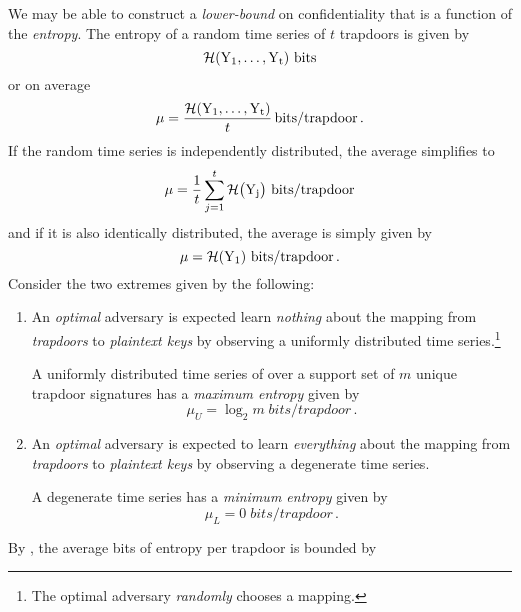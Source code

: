\documentclass[ ../main.tex]{subfiles}
\begin{document}
We may be able to construct a \emph{lower-bound} on confidentiality that is a function of the \emph{entropy}. The entropy of a random time series of $t$ trapdoors is given by
\begin{equation}
    \entropy\!\left(\rv{Y_1},\ldots,\rv{Y_t}\right)\, \si{bits}
\end{equation}
or on average
\begin{equation}
    \mu = \frac{\entropy\!\left(\rv{Y_1},\ldots,\rv{Y_t}\right)}{t} \, \si{bits \per trapdoor}\,.
\end{equation}
If the random time series is independently distributed, the average simplifies to
\begin{equation}
    \mu = \frac{1}{t} \sum_{j=1}^{t} \entropy\!\left(\rv{Y_j}\right) \, \si{bits \per trapdoor}
\end{equation}
and if it is also identically distributed, the average is simply given by
\begin{equation}
    \mu = \entropy\!\left(\rv{Y_1}\right) \, \si{bits \per trapdoor}\,.
\end{equation}
Consider the two extremes given by the following:
\begin{enumerate}
    \item
    \label{itm:maxentropy}
    An \emph{optimal} adversary is expected learn \emph{nothing} about the mapping from \emph{trapdoors} to \emph{plaintext keys} by observing a uniformly distributed time series.\footnote{The optimal adversary \emph{randomly} chooses a mapping.}
    
    A uniformly distributed time series of over a support set of $m$ unique trapdoor signatures has a \emph{maximum entropy} given by
    \begin{equation}
        \mu_{U} = \log_2 m \; \si{bits \per trapdoor}\,.
    \end{equation}
    
    \item
    \label{itm:minentropy}
    An \emph{optimal} adversary is expected to learn \emph{everything} about the mapping from \emph{trapdoors} to \emph{plaintext keys} by observing a degenerate time series.
    
    A degenerate time series has a \emph{minimum entropy} given by
    \begin{equation}
        \mu_{L} = 0 \; \si{bits \per trapdoor}\,.
    \end{equation}
\end{enumerate}
By , the average bits of entropy per trapdoor is bounded by
\end{document}
